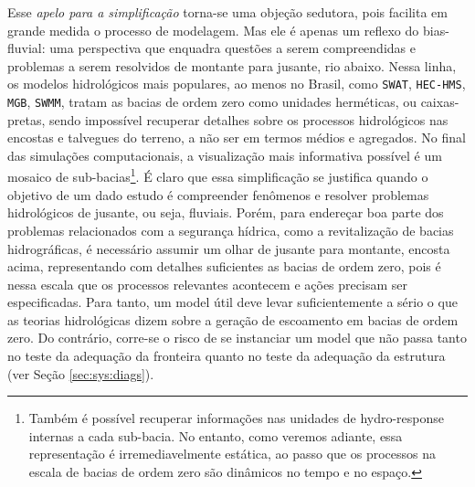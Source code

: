 \documentclass[./main.tex]{subfiles}
\begin{document}
\par Esse \textit{apelo para a simplificação} torna-se uma objeção sedutora, pois facilita em grande medida o processo de modelagem. Mas ele é apenas um reflexo do \gls{bias-fluvial}: uma perspectiva que enquadra questões a serem compreendidas e problemas a serem resolvidos de montante para jusante, rio abaixo. Nessa linha, os modelos hidrológicos mais populares, ao menos no Brasil, como \texttt{SWAT}, \texttt{HEC-HMS}, \texttt{MGB}, \texttt{SWMM}, tratam as bacias de ordem zero como unidades herméticas, ou caixas-pretas, sendo impossível recuperar detalhes sobre os processos hidrológicos nas encostas e talvegues do terreno, a não ser em termos médios e agregados. No final das simulações computacionais, a visualização mais informativa possível é um mosaico de sub-bacias\footnote{Também é possível recuperar informações nas unidades de \gls{hydro-response} internas a cada sub-bacia. No entanto, como veremos adiante, essa representação é irremediavelmente estática, ao passo que os processos na escala de bacias de ordem zero são dinâmicos no tempo e no espaço.}. É claro que essa simplificação se justifica quando o objetivo de um dado estudo é compreender fenômenos e resolver problemas hidrológicos de jusante, ou seja, fluviais. Porém, para endereçar boa parte dos problemas relacionados com a segurança hídrica, como a revitalização de bacias hidrográficas, é necessário assumir um olhar de jusante para montante, encosta acima, representando com detalhes suficientes as bacias de ordem zero, pois é nessa escala que os processos relevantes acontecem e ações precisam ser especificadas. Para tanto, um \gls{model} útil deve levar suficientemente a sério o que as teorias hidrológicas dizem sobre a geração de escoamento em bacias de ordem zero. Do contrário, corre-se o risco de se instanciar um \gls{model} que não passa tanto no teste da adequação da fronteira quanto no teste da adequação da estrutura (ver Seção \ref{sec:sys:diags}). 
\end{document}
